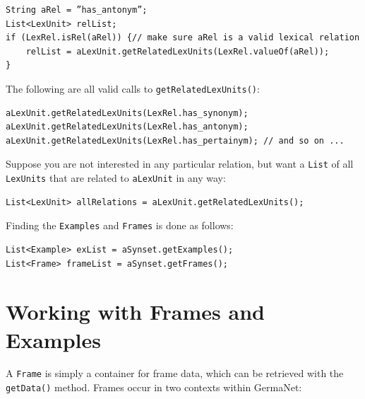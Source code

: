 \documentclass[12pt,a4paper,english,utf8]{report}
\begin{document}
\begin{lstlisting}String aRel = ”has_antonym”;
List<LexUnit> relList;
if (LexRel.isRel(aRel)) {// make sure aRel is a valid lexical relation
    relList = aLexUnit.getRelatedLexUnits(LexRel.valueOf(aRel));
}
\end{lstlisting}


The following are all valid calls to \texttt{getRelatedLexUnits()}:

\begin{lstlisting}
aLexUnit.getRelatedLexUnits(LexRel.has_synonym);
aLexUnit.getRelatedLexUnits(LexRel.has_antonym);
aLexUnit.getRelatedLexUnits(LexRel.has_pertainym); // and so on ...
\end{lstlisting}

Suppose you are not interested in any particular relation, but want a \texttt{List} of all \texttt{LexUnits} that are related to \texttt{aLexUnit} in any way:

\begin{lstlisting}
List<LexUnit> allRelations = aLexUnit.getRelatedLexUnits();
\end{lstlisting}

Finding the \texttt{Examples} and \texttt{Frames} is done as follows:

\begin{lstlisting}
List<Example> exList = aSynset.getExamples();
List<Frame> frameList = aSynset.getFrames();
\end{lstlisting}



\section{Working with Frames and Examples}
A \texttt{Frame} is simply a container for frame data, which can be retrieved with the \texttt{getData()} method. Frames occur in two contexts within GermaNet:
\end{document}
